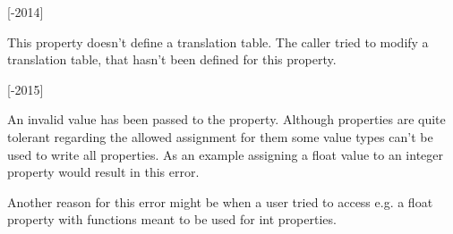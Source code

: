 \begin{Desc}
\begin{description}
{\bfseries }\mbox{[}-\/2014\mbox{]} \item[{\em 
\hypertarget{group___common_interface_gga61b0634ab285d9a2a303e0092167127ea6cba8f84da9fcc40dbc9081418782ebf}{P\+R\+O\+P\+H\+A\+N\+D\+L\+I\+N\+G\+\_\+\+P\+R\+O\+P\+\_\+\+T\+R\+A\+N\+S\+L\+A\+T\+I\+O\+N\+\_\+\+T\+A\+B\+L\+E\+\_\+\+N\+O\+T\+\_\+\+D\+E\+F\+I\+N\+E\+D}\label{group___common_interface_gga61b0634ab285d9a2a303e0092167127ea6cba8f84da9fcc40dbc9081418782ebf}
}]This property doesn't define a translation table. The caller tried to modify a translation table, that hasn't been defined for this property.

{\bfseries }\mbox{[}-\/2015\mbox{]} \item[{\em 
\hypertarget{group___common_interface_gga61b0634ab285d9a2a303e0092167127eab8ddf6821294b221e4b7b1582642f911}{P\+R\+O\+P\+H\+A\+N\+D\+L\+I\+N\+G\+\_\+\+I\+N\+V\+A\+L\+I\+D\+\_\+\+P\+R\+O\+P\+\_\+\+V\+A\+L\+U\+E\+\_\+\+T\+Y\+P\+E}\label{group___common_interface_gga61b0634ab285d9a2a303e0092167127eab8ddf6821294b221e4b7b1582642f911}
}]An invalid value has been passed to the property. Although properties are quite tolerant regarding the allowed assignment for them some value types can't be used to write all properties. As an example assigning a float value to an integer property would result in this error.

Another reason for this error might be when a user tried to access e.\+g. a float property with functions meant to be used for int properties.


\end{description}
\end{Desc}
